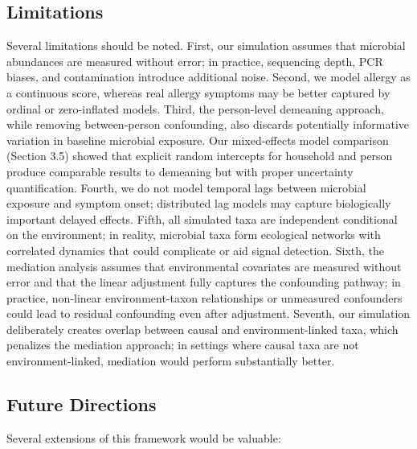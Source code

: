 \documentclass[11pt,letterpaper]{article}
\begin{document}
\subsection{Limitations}

Several limitations should be noted. First, our simulation assumes that microbial abundances are measured without error; in practice, sequencing depth, PCR biases, and contamination introduce additional noise. Second, we model allergy as a continuous score, whereas real allergy symptoms may be better captured by ordinal or zero-inflated models. Third, the person-level demeaning approach, while removing between-person confounding, also discards potentially informative variation in baseline microbial exposure. Our mixed-effects model comparison (Section 3.5) showed that explicit random intercepts for household and person produce comparable results to demeaning but with proper uncertainty quantification. Fourth, we do not model temporal lags between microbial exposure and symptom onset; distributed lag models \citep{gasparrini2010distributed} may capture biologically important delayed effects. Fifth, all simulated taxa are independent conditional on the environment; in reality, microbial taxa form ecological networks with correlated dynamics that could complicate or aid signal detection. Sixth, the mediation analysis assumes that environmental covariates are measured without error and that the linear adjustment fully captures the confounding pathway; in practice, non-linear environment-taxon relationships or unmeasured confounders could lead to residual confounding even after adjustment. Seventh, our simulation deliberately creates overlap between causal and environment-linked taxa, which penalizes the mediation approach; in settings where causal taxa are not environment-linked, mediation would perform substantially better.

\subsection{Future Directions}

Several extensions of this framework would be valuable:
\end{document}
